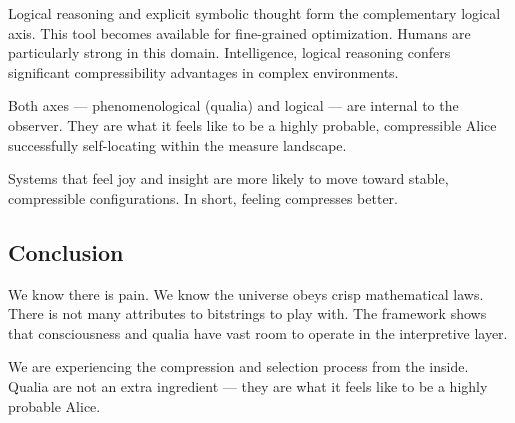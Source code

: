 Logical reasoning and explicit symbolic thought form the complementary logical axis.
This tool becomes available for fine-grained optimization. Humans are particularly strong in this domain. Intelligence, logical reasoning confers significant compressibility advantages in complex environments.

Both axes — phenomenological (qualia) and logical — are internal to the observer. They are what it feels like to be a highly probable, compressible Alice successfully self-locating within the measure landscape.

Systems that feel joy and insight are more likely to move toward stable, compressible configurations. In short, feeling compresses better.


\subsection*{Conclusion}

We know there is pain. We know the universe obeys crisp mathematical laws. There is not many attributes to bitstrings to play with. 
The framework shows that consciousness and qualia have vast room to operate in the interpretive layer. 

We are experiencing the compression and selection process from the inside. Qualia are not an extra ingredient — they are what it feels like to be a highly probable Alice.


